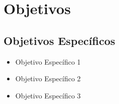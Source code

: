 \section{Objetivos}
\lipsum[1]

\subsection{Objetivos Específicos}

\lipsum[1]

\begin{itemize}
    \item Objetivo Específico 1
    \item Objetivo Específico 2
    \item Objetivo Específico 3
\end{itemize}
